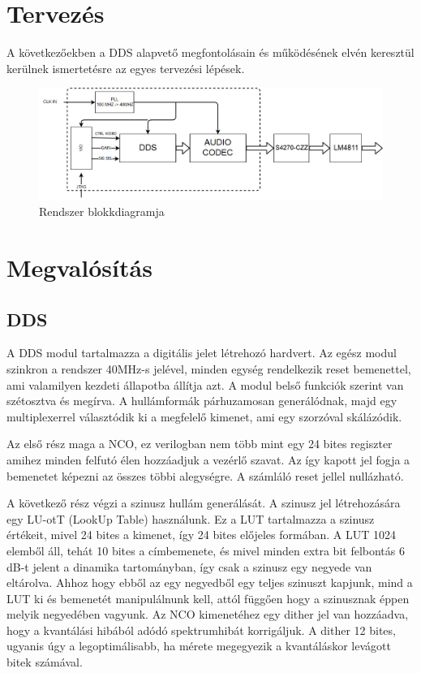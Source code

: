 \documentclass[a4paper,11pt]{article}
\begin{document}
\section{Tervezés}
A következőekben a DDS alapvető megfontolásain és működésének elvén keresztül kerülnek ismertetésre az egyes tervezési lépések. 

\begin{figure}[h!]
	\begin{center}
		\includegraphics[scale=0.48]{system_block.jpg}	
	\end{center}
	\caption{Rendszer blokkdiagramja}
	\label{a:DDSsystem}
\end{figure}

\section{Megvalósítás}

\subsection{DDS}

A DDS modul tartalmazza a digitális jelet létrehozó hardvert. Az egész modul szinkron a rendszer 40MHz-s jelével, minden egység rendelkezik reset bemenettel, ami valamilyen kezdeti állapotba állítja azt. A modul belső funkciók szerint van szétosztva és megírva. A hullámformák párhuzamosan generálódnak, majd egy multiplexerrel választódik ki a megfelelő kimenet, ami egy szorzóval skálázódik.

Az első rész maga a NCO, ez verilogban nem több mint egy 24 bites regiszter amihez minden felfutó élen hozzáadjuk a vezérlő szavat. Az így kapott jel fogja a bemenetet képezni az összes többi alegységre. A számláló reset jellel nullázható.

A következő rész végzi a szinusz hullám generálását. A szinusz jel létrehozására egy LU-otT (LookUp Table) használunk. Ez a LUT tartalmazza a szinusz értékeit, mivel 24 bites a kimenet, így 24 bites előjeles formában. A LUT 1024 elemből áll, tehát 10 bites a címbemenete, és mivel minden extra bit felbontás 6 dB-t jelent a dinamika tartományban, így csak a szinusz egy negyede van eltárolva. Ahhoz hogy ebből az egy negyedből egy teljes szinuszt kapjunk, mind a LUT ki és bemenetét manipulálnunk kell, attól függően hogy a szinusznak éppen melyik negyedében vagyunk. Az NCO kimenetéhez egy dither jel van hozzáadva, hogy a kvantálási hibából adódó spektrumhibát korrigáljuk. A dither 12 bites, ugyanis úgy a legoptimálisabb, ha mérete megegyezik a kvantáláskor levágott bitek számával.
\end{document}
